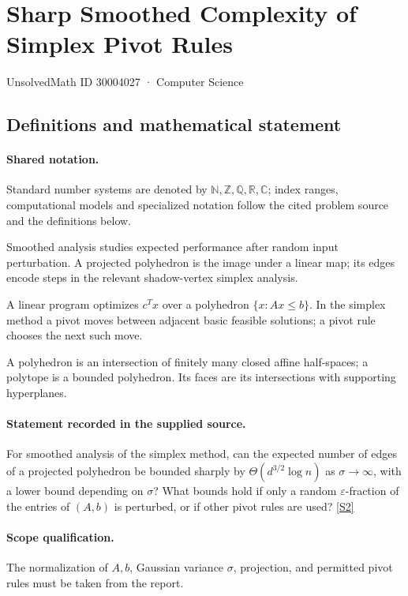 \documentclass[11pt]{article}
\newcommand{\sref}[2]{\hyperlink{source:#1:#2}{[S#2]}}
\begin{document}
\setcounter{section}{30004026}
\section{Sharp Smoothed Complexity of Simplex Pivot Rules}\label{30004027}
{\small\sffamily UnsolvedMath ID 30004027 · Computer Science}
\subsection{Definitions and mathematical statement}

\paragraph{Shared notation.}Standard number systems are denoted by $\mathbb N,\mathbb Z,\mathbb Q,\mathbb R,\mathbb C$; index ranges, computational models and specialized notation follow the cited problem source and the definitions below.


Smoothed analysis studies expected performance after random input perturbation. A projected polyhedron is the image under a linear map; its edges encode steps in the relevant shadow-vertex simplex analysis.

A linear program optimizes $c^Tx$ over a polyhedron $\{x:Ax\leq b\}$. In the simplex method a pivot moves between adjacent basic feasible solutions; a pivot rule chooses the next such move.

A polyhedron is an intersection of finitely many closed affine half-spaces; a polytope is a bounded polyhedron. Its faces are its intersections with supporting hyperplanes.
\paragraph{Statement recorded in the supplied source.}
For smoothed analysis of the simplex method, can the expected number of edges of a projected polyhedron be bounded sharply by $\Theta(d^{3/2}\log n)$ as $\sigma\to\infty$, with a lower bound depending on $\sigma$? What bounds hold if only a random $\varepsilon$-fraction of the entries of $(A,b)$ is perturbed, or if other pivot rules are used? \sref{30004027}{2}
\paragraph{Scope qualification.}
The normalization of $A,b$, Gaussian variance $\sigma$, projection, and permitted pivot rules must be taken from the report.
\end{document}

